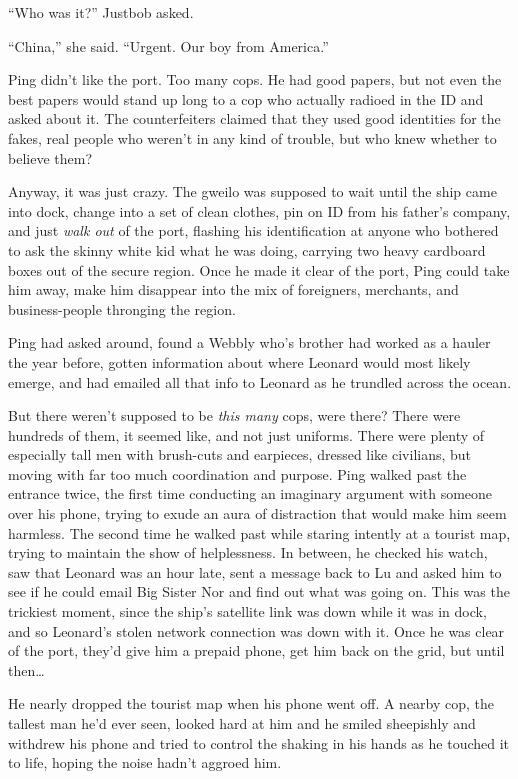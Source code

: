 ``Who was it?'' Justbob asked.

``China,'' she said. ``Urgent. Our boy from America.''

\tb

Ping didn't like the port. Too many cops. He had good papers, but
not even the best papers would stand up long to a cop who actually
radioed in the ID and asked about it. The counterfeiters claimed
that they used good identities for the fakes, real people who
weren't in any kind of trouble, but who knew whether to believe
them?

Anyway, it was just crazy. The gweilo was supposed to wait until
the ship came into dock, change into a set of clean clothes, pin on
ID from his father's company, and just \emph{walk out} of the port,
flashing his identification at anyone who bothered to ask the
skinny white kid what he was doing, carrying two heavy cardboard
boxes out of the secure region. Once he made it clear of the port,
Ping could take him away, make him disappear into the mix of
foreigners, merchants, and business-people thronging the region.

Ping had asked around, found a Webbly who's brother had worked as a
hauler the year before, gotten information about where Leonard
would most likely emerge, and had emailed all that info to Leonard
as he trundled across the ocean.

But there weren't supposed to be \emph{this many} cops, were there?
There were hundreds of them, it seemed like, and not just uniforms.
There were plenty of especially tall men with brush-cuts and
earpieces, dressed like civilians, but moving with far too much
coordination and purpose. Ping walked past the entrance twice, the
first time conducting an imaginary argument with someone over his
phone, trying to exude an aura of distraction that would make him
seem harmless. The second time he walked past while staring
intently at a tourist map, trying to maintain the show of
helplessness. In between, he checked his watch, saw that Leonard
was an hour late, sent a message back to Lu and asked him to see if
he could email Big Sister Nor and find out what was going on. This
was the trickiest moment, since the ship's satellite link was down
while it was in dock, and so Leonard's stolen network connection
was down with it. Once he was clear of the port, they'd give him a
prepaid phone, get him back on the grid, but until then\ldots{}

He nearly dropped the tourist map when his phone went off. A nearby
cop, the tallest man he'd ever seen, looked hard at him and he
smiled sheepishly and withdrew his phone and tried to control the
shaking in his hands as he touched it to life, hoping the noise
hadn't aggroed him.

